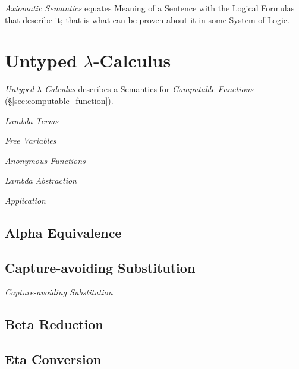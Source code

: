 \documentclass{article}
\begin{document}
\emph{Axiomatic Semantics} equates Meaning of a Sentence with the
Logical Formulas that describe it; that is what can be proven about it
in some System of Logic.

\section{Untyped $\lambda$-Calculus}\label{sec:untyped_lambda}

\emph{Untyped $\lambda$-Calculus} describes a Semantics for
\emph{Computable Functions} (\S\ref{sec:computable_function}).

\emph{Lambda Terms}

\emph{Free Variables}

\emph{Anonymous Functions}

\emph{Lambda Abstraction}

\emph{Application}

\subsection{Alpha Equivalence}\label{subsec:alpha_equivalent}

\subsection{Capture-avoiding Substitution}\label{subsec:capture_avoiding}

\emph{Capture-avoiding Substitution}

\subsection{Beta Reduction}\label{subsec:beta_reduction}

\subsection{Eta Conversion}\label{subsec:eta_conversion}
\end{document}

